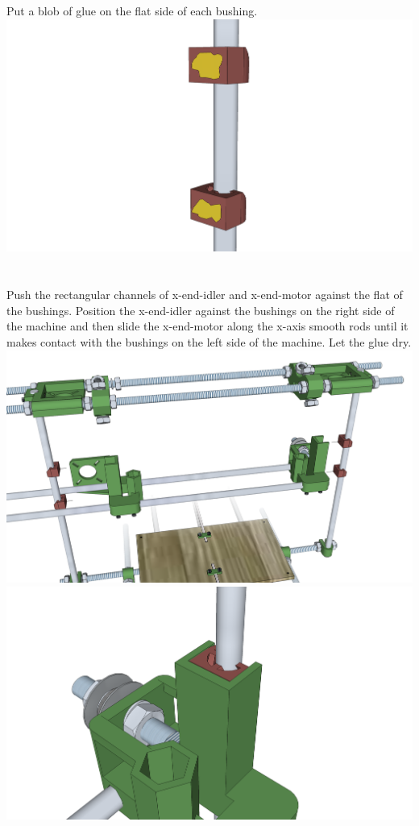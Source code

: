 \documentclass[twoside,openany,a4paper,titlepage]{memoir}
\begin{document}
	\section{}
	Put a blob of glue on the flat side of each bushing.\\
	\includegraphics[width=1\linewidth]{graphics/ch8_11.png}
	
	\section{}
	Push the rectangular channels of x-end-idler and x-end-motor against the flat of the bushings. Position
	the x-end-idler against the bushings on the right side of the machine and then slide the x-end-motor
	along the x-axis smooth rods until it makes contact with the bushings on the left side of the machine.
	Let the glue dry.\\
	\includegraphics[width=1\linewidth]{graphics/ch8_12_1.png}
	\includegraphics[width=1\linewidth]{graphics/ch8_12_2.png}
	
\end{document}
